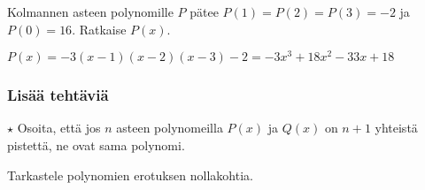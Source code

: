 \begin{tehtavasivu}
\begin{tehtava}
    Kolmannen asteen polynomille $P$ pätee $P(1)=P(2)=P(3)=-2$ ja $P(0)=16$. Ratkaise $P(x)$.
    \begin{vastaus}
        $P(x)=-3(x-1)(x-2)(x-3)-2=-3x^3+18x^2-33x+18$
    \end{vastaus}
\end{tehtava}

\subsubsection*{Lisää tehtäviä}

\begin{tehtava}
   	$\star$ Osoita, että jos $n$ asteen polynomeilla $P(x)$ ja $Q(x)$ on $n+1$ yhteistä pistettä, ne ovat sama polynomi.
    \begin{vastaus}
        Tarkastele polynomien erotuksen nollakohtia.
    \end{vastaus}
\end{tehtava}

\end{tehtavasivu}